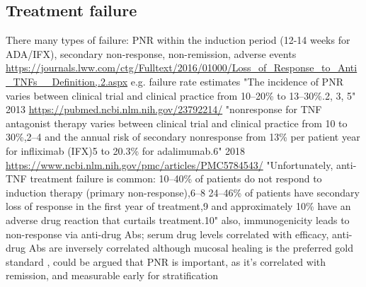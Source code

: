 \begin{outline}
\subsection{Treatment failure}

\1 There many types of failure: \gls{PNR} within the induction period (12-14 weeks for ADA/IFX), secondary non-response, non-remission, adverse events \url{https://journals.lww.com/ctg/Fulltext/2016/01000/Loss_of_Response_to_Anti_TNFs__Definition,.2.aspx}
    \2 e.g. failure rate estimates
        \3 "The incidence of PNR varies between clinical trial and clinical practice from 10–20\% to 13–30\%.2, 3, 5" 2013 \url{https://pubmed.ncbi.nlm.nih.gov/23792214/}
        \3 "nonresponse for TNF antagonist therapy varies between clinical trial and clinical practice from 10 to 30\%,2–4 and the annual risk of secondary nonresponse from 13\% per patient year for infliximab (IFX)5 to 20.3\% for adalimumab.6" 2018 \url{https://www.ncbi.nlm.nih.gov/pmc/articles/PMC5784543/}
        \3 "Unfortunately, anti-TNF treatment failure is common: 10–40\% of patients do not respond to induction therapy (primary non-response),6–8 24–46\% of patients have secondary loss of response in the first year of treatment,9 and approximately 10\% have an adverse drug reaction that curtails treatment.10" \autocite{kennedy2019PredictorsAntiTNFTreatment}
    \2 also, immunogenicity leads to non-response via anti-drug Abs; serum drug levels correlated with efficacy, anti-drug Abs are inversely correlated \autocite{lichtenstein2013ComprehensiveReviewAntitumor}
    \2 although mucosal healing is the preferred gold standard \autocite{roda2020CrohnDisease}, could be argued that PNR is important, as it's correlated with remission, and measurable early for stratification


\end{outline}

